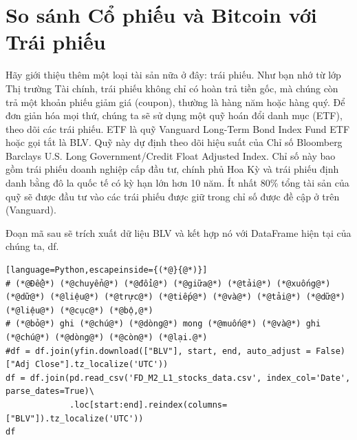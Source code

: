 \section{So sánh Cổ phiếu và Bitcoin với Trái phiếu}

Hãy giới thiệu thêm một loại tài sản nữa ở đây: trái phiếu. Như bạn nhớ từ lớp Thị trường Tài chính, trái phiếu không chỉ có hoàn trả tiền gốc, mà chúng còn trả một khoản phiếu giảm giá (coupon), thường là hàng năm hoặc hàng quý. Để đơn giản hóa mọi thứ, chúng ta sẽ sử dụng một quỹ hoán đổi danh mục (ETF), theo dõi các trái phiếu. ETF là quỹ Vanguard Long-Term Bond Index Fund ETF hoặc gọi tắt là BLV. Quỹ này dự định theo dõi hiệu suất của Chỉ số Bloomberg Barclays U.S. Long Government/Credit Float Adjusted Index. Chỉ số này bao gồm trái phiếu doanh nghiệp cấp đầu tư, chính phủ Hoa Kỳ và trái phiếu định danh bằng đô la quốc tế có kỳ hạn lớn hơn 10 năm. Ít nhất 80\% tổng tài sản của quỹ sẽ được đầu tư vào các trái phiếu được giữ trong chỉ số được đề cập ở trên (Vanguard).

Đoạn mã sau sẽ trích xuất dữ liệu BLV và kết hợp nó với DataFrame hiện tại của chúng ta, df.

\begin{lstlisting}[language=Python,escapeinside={(*@}{@*)}]
# (*@Để@*) (*@chuyển@*) (*@đổi@*) (*@giữa@*) (*@tải@*) (*@xuống@*) (*@dữ@*) (*@liệu@*) (*@trực@*) (*@tiếp@*) (*@và@*) (*@tải@*) (*@dữ@*) (*@liệu@*) (*@cục@*) (*@bộ,@*) 
# (*@bỏ@*) ghi (*@chú@*) (*@dòng@*) mong (*@muốn@*) (*@và@*) ghi (*@chú@*) (*@dòng@*) (*@còn@*) (*@lại.@*)
#df = df.join(yfin.download(["BLV"], start, end, auto_adjust = False)["Adj Close"].tz_localize('UTC'))
df = df.join(pd.read_csv('FD_M2_L1_stocks_data.csv', index_col='Date', parse_dates=True)\
             .loc[start:end].reindex(columns=["BLV"]).tz_localize('UTC'))
df
\end{lstlisting}

